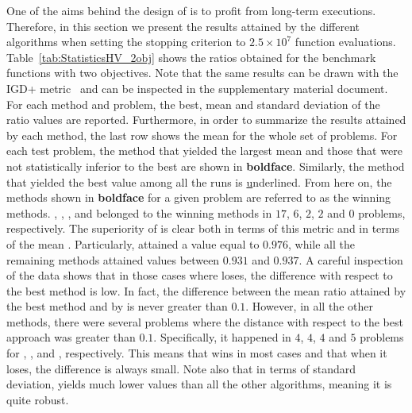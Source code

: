 One of the aims behind the design of \AVSDMOEAD{} is to profit from long-term executions.
%
Therefore, in this section we present the results attained by the different algorithms when setting 
the stopping criterion to $2.5 \times 10^7$ function evaluations.
%
Table~\ref{tab:StatisticsHV_2obj} shows the \HV{} ratios obtained for the benchmark functions with two objectives.
%
Note that the same results can be drawn with the IGD+ metric~\cite{ishibuchi2015modified} and can be inspected in the supplementary material document.
%
For each method and problem, the best, mean and standard deviation of the \HV{} ratio values are reported.
%
Furthermore, in order to summarize the results attained by each method, the last row shows the mean for the whole set 
of problems.
%
For each test problem, the method that yielded the largest mean and those that were not statistically inferior to the 
best are shown in \textbf{boldface}.
%
Similarly, the method that yielded the best \HV{} value among all the runs is {\ul underlined}.
%
From here on, the methods shown in {\bf boldface} for a given problem are referred to as the winning methods.
%
\AVSDMOEAD{}, \RMOEA{}, \MOEADDE{}, \NSGAIII{} and \NSGAII{} belonged to the winning methods in 
$17$, $6$, $2$, $2$ and $0$ problems, respectively.
%
The superiority of \AVSDMOEAD{} is clear both in terms of this metric and in terms of the mean \HV{}.
%
Particularly, \AVSDMOEAD{} attained a value equal to $0.976$, while all the remaining methods attained values between
$0.931$ and $0.937$.
%
A careful inspection of the data shows that in those cases where \AVSDMOEAD{} loses, the difference with respect to the best 
method is low.
%
In fact, the difference between the mean \HV{} ratio attained by the best method and by \AVSDMOEAD{} is never greater than $0.1$.
%
However, in all the other methods, there were several problems where the distance with respect to the best approach
was greater than $0.1$.
%
Specifically, it happened in $4$, $4$, $4$ and $5$ problems for \RMOEA{}, \MOEADDE{}, \NSGAII{} and \NSGAIII{}, respectively.
%
This means that \AVSDMOEAD{} wins in most cases and that when it loses, the difference is always small.
%
Note also that in terms of standard deviation, \AVSDMOEAD{} yields much lower values than all the other algorithms, meaning
it is quite robust.


